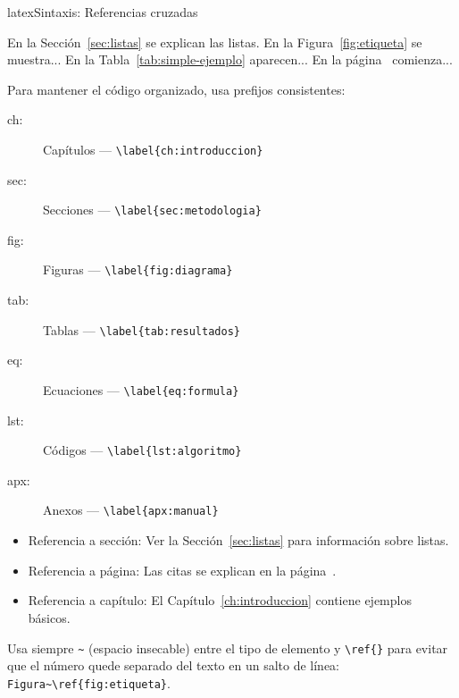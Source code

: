 \begin{codigosimple}{latex}{Sintaxis: Referencias cruzadas}
\label{tipo:nombre}

En la Sección~\ref{sec:listas} se explican las listas.
En la Figura~\ref{fig:etiqueta} se muestra...
En la Tabla~\ref{tab:simple-ejemplo} aparecen...
En la página~\pageref{sec:listas} comienza...
\end{codigosimple}


Para mantener el código organizado, usa prefijos consistentes:

\begin{description}
  \item[ch:] Capítulos --- \verb|\label{ch:introduccion}|
  \item[sec:] Secciones --- \verb|\label{sec:metodologia}|
  \item[fig:] Figuras --- \verb|\label{fig:diagrama}|
  \item[tab:] Tablas --- \verb|\label{tab:resultados}|
  \item[eq:] Ecuaciones --- \verb|\label{eq:formula}|
  \item[lst:] Códigos --- \verb|\label{lst:algoritmo}|
  \item[apx:] Anexos --- \verb|\label{apx:manual}|
\end{description}


\begin{itemize}
  \item Referencia a sección: Ver la Sección~\ref{sec:listas} para información sobre listas.
  \item Referencia a página: Las citas se explican en la página~\pageref{sec:citas}.
  \item Referencia a capítulo: El Capítulo~\ref{ch:introduccion} contiene ejemplos básicos.
\end{itemize}

\begin{tipbox}
  Usa siempre \verb|~| (espacio insecable) entre el tipo de elemento y
  \verb|\ref{}| para evitar que el número quede separado del texto en
  un salto de línea: \verb|Figura~\ref{fig:etiqueta}|.
\end{tipbox}

